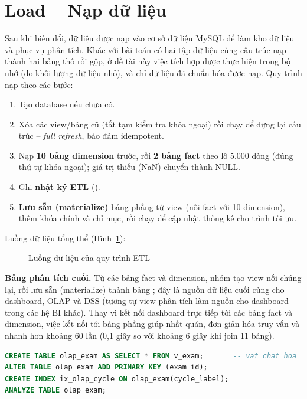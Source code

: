 \section{Load -- Nạp dữ liệu}
Sau khi biến đổi, dữ liệu được nạp vào cơ sở dữ liệu MySQL để làm kho dữ liệu và phục vụ phân tích. Khác với bài toán có hai tập dữ liệu cùng cấu trúc nạp thành hai bảng thô rồi gộp, ở đề tài này việc tích hợp được thực hiện trong bộ nhớ (do khối lượng dữ liệu nhỏ), và chỉ dữ liệu đã chuẩn hóa được nạp. Quy trình nạp theo các bước:
\begin{enumerate}
\item Tạo database  nếu chưa có.
\item Xóa các view/bảng cũ (tắt tạm kiểm tra khóa ngoại) rồi chạy  để dựng lại cấu trúc -- \emph{full refresh}, bảo đảm idempotent.
\item Nạp \textbf{10 bảng dimension} trước, rồi \textbf{2 bảng fact} theo lô 5.000 dòng (đúng thứ tự khóa ngoại); giá trị thiếu (NaN) chuyển thành NULL.
\item Ghi \textbf{nhật ký ETL} ().
\item \textbf{Lưu sẵn (materialize)} bảng phẳng  từ view  (nối fact với 10 dimension), thêm khóa chính và chỉ mục, rồi chạy  để cập nhật thống kê cho trình tối ưu.
\end{enumerate}
Luồng dữ liệu tổng thể (Hình~\ref{fig:etlflow}):
\begin{figure}[H]
\centering
{}
\caption{Luồng dữ liệu của quy trình ETL}\label{fig:etlflow}
\end{figure}
\textbf{Bảng phân tích cuối.} Từ các bảng fact và dimension, nhóm tạo view  nối chúng lại, rồi lưu sẵn (materialize) thành bảng ; đây là nguồn dữ liệu cuối cùng cho dashboard, OLAP và DSS (tương tự view phân tích làm nguồn cho dashboard trong các hệ BI khác). Thay vì kết nối dashboard trực tiếp tới các bảng fact và dimension, việc kết nối tới bảng phẳng giúp nhất quán, đơn giản hóa truy vấn và nhanh hơn khoảng 60 lần (0,1 giây so với khoảng 6 giây khi join 11 bảng).
\begin{lstlisting}[language=SQL]
CREATE TABLE olap_exam AS SELECT * FROM v_exam;       -- vat chat hoa
ALTER TABLE olap_exam ADD PRIMARY KEY (exam_id);
CREATE INDEX ix_olap_cycle ON olap_exam(cycle_label);
ANALYZE TABLE olap_exam;
\end{lstlisting}

